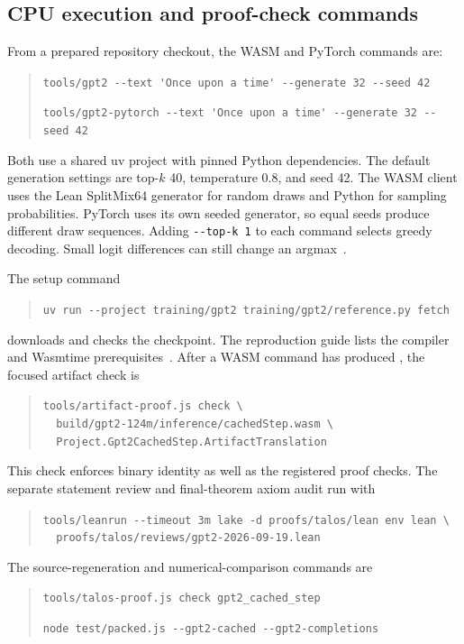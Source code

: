 \subsection{CPU execution and proof-check commands}

From a prepared repository checkout, the WASM and PyTorch commands are:
\begin{quote}\small\ttfamily
\verb|tools/gpt2 --text 'Once upon a time' --generate 32 --seed 42|

\verb|tools/gpt2-pytorch --text 'Once upon a time' --generate 32 --seed 42|
\end{quote}
Both use a shared uv project with pinned Python dependencies.  The default generation settings are top-$k$ 40, temperature 0.8, and seed 42.  The WASM client uses the Lean SplitMix64 generator for random draws and Python for sampling probabilities.  PyTorch uses its own seeded generator, so equal seeds produce different draw sequences.  Adding \verb|--top-k 1| to each command selects greedy decoding.  Small logit differences can still change an argmax~\cite{driver}.

The setup command
\begin{quote}\small\ttfamily
\verb|uv run --project training/gpt2 training/gpt2/reference.py fetch|
\end{quote}
downloads and checks the checkpoint.  The reproduction guide lists the compiler and Wasmtime prerequisites~\cite{guide}.  After a WASM command has produced , the focused artifact check is
\begin{quote}\small\ttfamily
\verb|tools/artifact-proof.js check \|\\
\verb|  build/gpt2-124m/inference/cachedStep.wasm \|\\
\verb|  Project.Gpt2CachedStep.ArtifactTranslation|
\end{quote}
This check enforces binary identity as well as the registered proof checks.  The separate statement review and final-theorem axiom audit run with
\begin{quote}\small\ttfamily
\verb|tools/leanrun --timeout 3m lake -d proofs/talos/lean env lean \|\\
\verb|  proofs/talos/reviews/gpt2-2026-09-19.lean|
\end{quote}
The source-regeneration and numerical-comparison commands are
\begin{quote}\small\ttfamily
\verb|tools/talos-proof.js check gpt2_cached_step|

\verb|node test/packed.js --gpt2-cached --gpt2-completions|
\end{quote}

